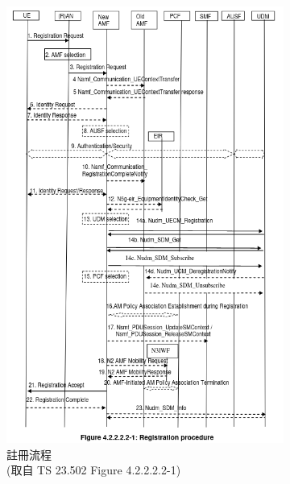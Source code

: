 \begin{figure}[htbp]
    \centering
    \captionsetup{justification=centering}
    \begin{subfigure}[b]{.5\linewidth}
        \centering
        \includegraphics[height=!,width=0.835\linewidth,keepaspectratio=true]{figures/23_502_4_2_2_2_2-1_reg_proc}
        \caption[註冊流程]{{註冊流程\\\scriptsize (取自 TS 23.502 Figure 4.2.2.2.2-1)}}
        \label{fig:reg_proc}
    \end{subfigure}%
    \begin{subfigure}[b]{.5\linewidth}
        \centering

\end{subfigure}
\end{figure}

